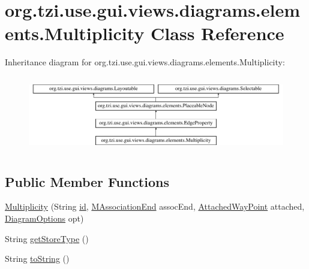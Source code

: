 \hypertarget{classorg_1_1tzi_1_1use_1_1gui_1_1views_1_1diagrams_1_1elements_1_1_multiplicity}{\section{org.\-tzi.\-use.\-gui.\-views.\-diagrams.\-elements.\-Multiplicity Class Reference}
\label{classorg_1_1tzi_1_1use_1_1gui_1_1views_1_1diagrams_1_1elements_1_1_multiplicity}
}
Inheritance diagram for org.\-tzi.\-use.\-gui.\-views.\-diagrams.\-elements.\-Multiplicity\-:\begin{figure}[H]
\begin{center}
\leavevmode
\includegraphics[height=3.353293cm]{classorg_1_1tzi_1_1use_1_1gui_1_1views_1_1diagrams_1_1elements_1_1_multiplicity}
\end{center}
\end{figure}
\subsection*{Public Member Functions}
\begin{DoxyCompactItemize}
\item 
\hyperlink{classorg_1_1tzi_1_1use_1_1gui_1_1views_1_1diagrams_1_1elements_1_1_multiplicity_a9004bdcbaec1b34d32c70f22352a126b}{Multiplicity} (String \hyperlink{classorg_1_1tzi_1_1use_1_1gui_1_1views_1_1diagrams_1_1elements_1_1_edge_property_a628f8eb4c55c3973fb61f0d76787ac0b}{id}, \hyperlink{classorg_1_1tzi_1_1use_1_1uml_1_1mm_1_1_m_association_end}{M\-Association\-End} assoc\-End, \hyperlink{classorg_1_1tzi_1_1use_1_1gui_1_1views_1_1diagrams_1_1waypoints_1_1_attached_way_point}{Attached\-Way\-Point} attached, \hyperlink{classorg_1_1tzi_1_1use_1_1gui_1_1views_1_1diagrams_1_1_diagram_options}{Diagram\-Options} opt)
\item 
String \hyperlink{classorg_1_1tzi_1_1use_1_1gui_1_1views_1_1diagrams_1_1elements_1_1_multiplicity_aab19416fafe59ab84e8e2fe9916fd622}{get\-Store\-Type} ()
\item 
String \hyperlink{classorg_1_1tzi_1_1use_1_1gui_1_1views_1_1diagrams_1_1elements_1_1_multiplicity_a137c0cb51a0bbd2444815b43aafd0808}{to\-String} ()
\end{DoxyCompactItemize}
